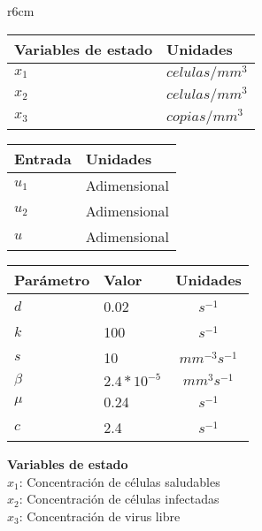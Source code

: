 \documentclass{article}
\begin{document}
\begin{wraptable}[0]{r}{6cm}
    \begin{tabular}{|p{3.5cm} p{2.5cm}|}
        \hline
        Variables de estado & Unidades \\
        \hline
        $x_1$ & $celulas / mm^3$\\
        $x_2$ & $celulas / mm^3$\\
        $x_3$ & $copias / mm^3$\\
        \hline
    \end{tabular}
    \newline
    \vspace{0.5cm}
    \newline
    \begin{tabular}{|p{3cm} p{3cm}|}
        \hline
        Entrada & Unidades \\
        \hline
        $u_1$ & Adimensional \\
        $u_2$ & Adimensional \\
        $u$   & Adimensional \\
        \hline
    \end{tabular}
    \newline
    \vspace{0.5cm}
    \newline
    \begin{tabular}{|p{2cm} p{2cm} c|}
        \hline
        Parámetro & Valor & Unidades \\
        \hline
        $d$     & 0.02            & $s^{-1}$\\
        $k$     & 100             & $s^{-1}$\\
        $s$     & 10              & $mm^{-3} s^{-1}$\\
        $\beta$ & $2.4 * 10^{-5}$ & $mm^3 s^{-1}$\\
        $\mu$   & 0.24            & $s^{-1}$\\
        $c$     & 2.4             & $s^{-1}$\\
        \hline
    \end{tabular}
\end{wraptable}

\large{\bf{Variables de estado}}\\

\noindent
$x_1$: Concentración de células saludables\\
$x_2$: Concentración de células infectadas\\
$x_3$: Concentración de virus libre\\
\end{document}
